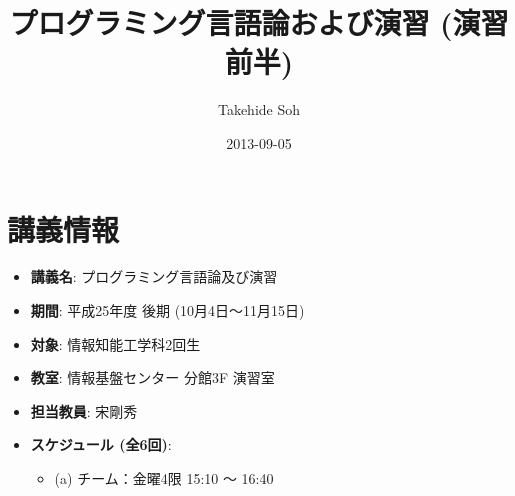 \documentclass[a4j]{article}
\title{プログラミング言語論および演習 (演習前半)}
\author{Takehide Soh}
\date{2013-09-05}
\begin{document}
\maketitle



\section*{講義情報}
\label{sec-1}
\begin{itemize}

\item \textbf{講義名}: プログラミング言語論及び演習
\label{sec-1-1}%

\item \textbf{期間}: 平成25年度 後期 (10月4日〜11月15日)
\label{sec-1-2}%

\item \textbf{対象}: 情報知能工学科2回生
\label{sec-1-3}%


\item \textbf{教室}: 情報基盤センター 分館3F 演習室
\label{sec-1-4}%

\item \textbf{担当教員}: 宋剛秀
\label{sec-1-5}%

\item \textbf{スケジュール (全6回)}:
\label{sec-1-6}%
\begin{itemize}

\item (a) チーム：金曜4限 15:10 〜 16:40
\label{sec-1-6-1}%


\end{itemize}
\end{itemize}
\end{document}
